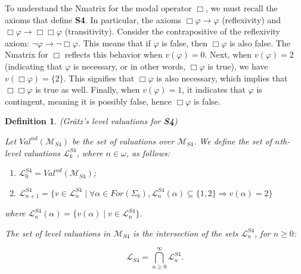 \documentclass[12pt]{article}
\newtheorem{definition}[theorem]{Definition}
\newcommand{\sfo}{\textbf{S4}}
\begin{document}





To understand the Nmatrix for the modal operator $\Box$, we must recall the axioms that define \sfo. In particular, the axioms $\Box \varphi \to \varphi$ (reflexivity) and $\Box \varphi \to \Box \Box \varphi$ (transitivity). Consider the contrapositive of the reflexivity axiom: $\neg \varphi \to \neg \Box \varphi$. This means that if $\varphi$ is false, then $\Box \varphi$ is also false. The Nmatrix for $\Box$ reflects this behavior when $v(\varphi) = 0$. Next, when $v(\varphi) = 2$ (indicating that $\varphi$ is necessary, or in other words, $\Box \varphi$ is true), we have $v(\Box \varphi) = \{2\}$. This signifies that $\Box \varphi$ is also necessary, which implies that $\Box \Box \varphi$ is true as well. Finally, when $v(\varphi) = 1$, it indicates that $\varphi$ is contingent, meaning it is possibly false, hence $\Box \varphi$ is false.

\begin{definition}\label{def:level_valuations_2}(Gr\"atz's level valuations for \textbf{S4})

    Let $Val^{nd}(\mathcal{M}_{S4})$ be the set of  valuations over $\mathcal{M}_{S4}$. We define the set of $n$th-level valuations $\mathcal{L}^{S4}_k$, where $n \in \omega$, as follows:

    \begin{enumerate}[label=\roman*)]
        \item $\mathcal{L}_0^{S4} = Val^{nd}(\mathcal{M}_{S4})$;
        \item $\mathcal{L}^{S4}_{n + 1} = \{ v \in \mathcal{L}^{S4}_n \mid \forall \alpha \in For(\Sigma_{b}), \mathcal{L}^{S4}_n(\alpha) \subseteq \{1,2\} \Rightarrow v(\alpha) = 2 \}$
    \end{enumerate}

    where $\mathcal{L}^{S4}_n(\alpha) = \{ v(\alpha) \mid v \in \mathcal{L}^{S4}_n \}$.
    
    The set of level valuations in $\mathcal{M}_{S4}$ is the intersection of the sets $\mathcal{L}^{S4}_n$, for $n\geq0$:

    \[
        \mathcal{L}_{S4} = \bigcap^\infty_{n \geq 0} \mathcal{L}^{S4}_n.
    \]
\end{definition}
\end{document}
